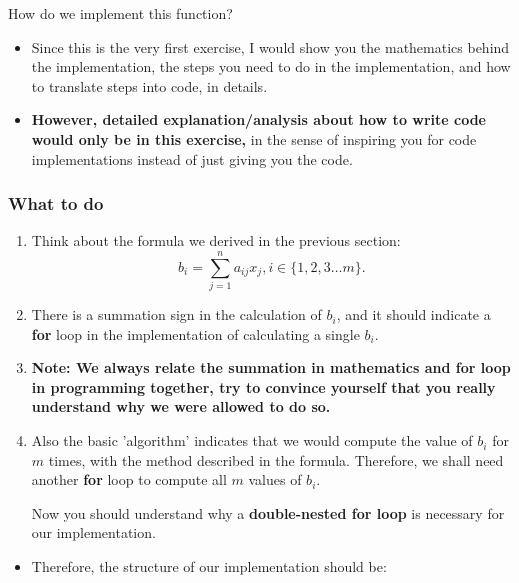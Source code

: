 \smallskip
\noindent How do we implement this function? 

\begin{itemize}
  \item Since this is the very first exercise, I would show you the mathematics behind the implementation, the steps you need to do in the implementation, and how to translate steps into code, in details. 
  \item \textbf{However, detailed explanation/analysis about how to write code would only be in this exercise, }in the sense of inspiring you for code implementations instead of just giving you the code.
\end{itemize}
\subsubsection*{What to do}
\begin{enumerate}
    \item Think about the formula we derived in the previous section:
    \[
    b_i = \sum_{j = 1}^{n} a_{ij} x_j, i \in \{1, 2, 3 \ldots m\}
    .\] 
  \item There is a summation sign in the calculation of $b_i$, and it should indicate a \textbf{for} loop in the implementation of calculating a single $b_i$.
  \item \textbf{Note: We always relate the summation in mathematics and for loop in programming together, try to convince yourself that you really understand why we were allowed to do so.}
  \item Also the basic 'algorithm' indicates that we would compute the value of $b_i$ for $m$ times, with the method described in the formula. Therefore, we shall need another \textbf{for} loop to compute all $m$ values of $b_i$. 
  
  Now you should understand why a \textbf{double-nested for loop} is necessary for our implementation.
\end{enumerate}
\begin{itemize}
   \item Therefore, the structure of our implementation should be:
     
\end{itemize}
